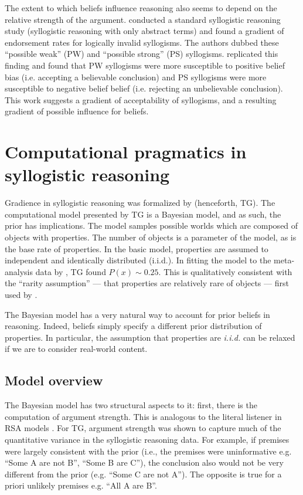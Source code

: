 \documentclass{llncs} %
\begin{document}
The extent to which beliefs influence reasoning also seems to depend on the relative strength of the argument.  conducted a standard syllogistic reasoning study (syllogistic reasoning with only abstract terms) and found a gradient of endorsement rates for logically invalid syllogisms. The authors dubbed these ``possible weak'' (PW) and ``possible strong'' (PS) syllogisms.  replicated this finding and found that PW syllogisms were more susceptible to positive belief bias (i.e. accepting a believable conclusion) and PS syllogisms were more susceptible to negative belief belief (i.e. rejecting an unbelievable conclusion). This work suggests a gradient of acceptability of syllogisms, and a resulting gradient of possible influence for beliefs. 


\section{Computational pragmatics in syllogistic reasoning}

Gradience in syllogistic reasoning was formalized by  (henceforth, TG). The computational model presented by TG is a Bayesian model, and as such, the prior has implications. The model samples possible worlds which are composed of objects with properties. The number of objects is a parameter of the model, as is the base rate of properties. In the basic model, properties are assumed to independent and identically distributed (i.i.d.). In fitting the model to the meta-analysis data by , TG found $P(x) \sim 0.25$. This is qualitatively consistent with the ``rarity assumption'' --- that properties are relatively rare of objects --- first used by .

The Bayesian model has a very natural way to account for prior beliefs in reasoning. Indeed, beliefs simply specify a different prior distribution of properties. In particular, the assumption that properties are \emph{i.i.d.} can be relaxed if we are to consider real-world content.

\subsection{Model overview}

The Bayesian model has two structural aspects to it: first, there is the computation of argument strength. This is analogous to the literal listener in RSA models \cite{Frank2012,Goodman2013}. For TG,  argument strength was shown to capture much of the quantitative variance in the syllogistic reasoning data. For example, if premises were largely consistent with the prior (i.e., the premises were uninformative e.g. ``Some A are not B'', ``Some B are C''), the conclusion also would not be very different from the prior (e.g. ``Some C are not A''). The opposite is true for a priori unlikely premises e.g. ``All A are B''.  
\end{document}

